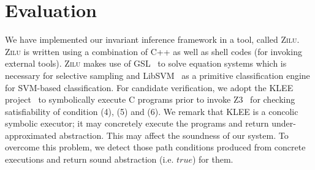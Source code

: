 
\section{Evaluation} %
\label{sec:evaluations}
We have implemented our invariant inference framework in a tool, called \textsc{Zilu}. \textsc{Zilu} is written using a combination of C++ as well as shell codes (for invoking external tools).
\textsc{Zilu} makes use of GSL~\cite{gough2009gnu} to solve equation systems which is necessary for selective sampling and
 LibSVM~\cite{chang2011libsvm} as a primitive classification engine for
SVM-based classification. %
For candidate verification, we %
adopt the KLEE project~\cite{cadar2008klee} to
symbolically execute
 C programs %
prior to invoke Z3~\cite{de2008z3} for checking satisfiability of
condition (4), (5) and (6).
 We remark that KLEE is a concolic symbolic executor; it may
concretely execute the programs and return
 under-approximated
abstraction. This may affect the soundness of our system.
To overcome this problem, we detect those path conditions produced from
concrete executions
and return sound abstraction (i.e. $true$) for them.

